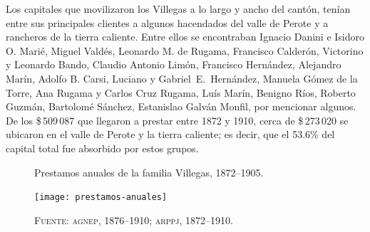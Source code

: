 \documentclass[14pt,twoside,final]{extbook} %
\begin{document}
Los capitales que movilizaron los Villegas a lo largo y ancho del cantón, tenían entre sus principales clientes a algunos hacendados del valle de Perote y a rancheros de la tierra caliente. Entre ellos se encontraban Ignacio Danini e Isidoro O. Marié, Miguel Valdés, Leonardo M. de Rugama, Francisco Calderón, Victorino y Leonardo Bando, Claudio Antonio Limón, Francisco Hernández, Alejandro Marín, Adolfo B. Carsi, Luciano y Gabriel~E.~Hernández, Manuela Gómez de la Torre, Ana Rugama y Carlos Cruz Rugama, Luís Marín, Benigno Ríos, Roberto Guzmán, Bartolomé Sánchez, Estanislao Galván Monfil, por mencionar algunos. De los \$\,509\,087 que llegaron a prestar entre 1872 y 1910, cerca de \$\,273\,020 se ubicaron en el valle de Perote y la tierra caliente; es decir, que el 53.6\% del capital total fue absorbido por estos grupos.
\begin{figure}
\caption[Préstamos anuales de la familia Villegas, 1872--1905]{Prestamos anuales de la familia Villegas, 1872--1905.}
\texttt{[image: prestamos-anuales]}
\caption*{\textsc{Fuente:} \textsc{agnep}, 1876--1910; \textsc{arppj, 1872--1910}.}
\label{fig:prestamos-anuales-familia-villegas}
\end{figure}
\end{document}
